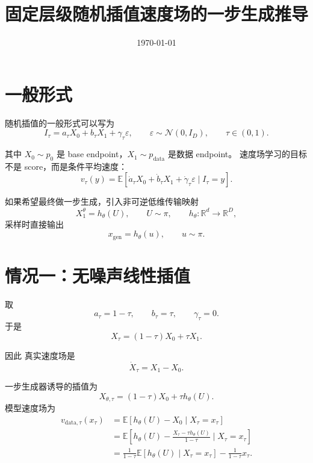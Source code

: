 \documentclass[UTF8,11pt]{ctexart}
\title{固定层级随机插值速度场的一步生成推导}
\author{}
\date{\today}
\newcommand{\E}{\mathbb{E}}
\newcommand{\R}{\mathbb{R}}
\newcommand{\calN}{\mathcal{N}}
\begin{document}
\maketitle

\section{一般形式}

随机插值的一般形式可以写为
\begin{equation}
I_\tau
=
a_\tau X_0
+
b_\tau X_1
+
\gamma_\tau \varepsilon,
\qquad
\varepsilon \sim \calN(0,I_D),
\qquad
\tau\in(0,1).
\end{equation}

其中 \(X_0\sim p_0\) 是 base endpoint，\(X_1\sim p_{\mathrm{data}}\) 是数据 endpoint。
速度场学习的目标不是 score，而是条件平均速度：
\begin{equation}
v_\tau(y)
=
\E
\left[
\dot a_\tau X_0
+
\dot b_\tau X_1
+
\dot \gamma_\tau \varepsilon
\mid
I_\tau=y
\right].
\end{equation}

如果希望最终做一步生成，引入非可逆低维传输映射
\begin{equation}
X_1^\theta=h_\theta(U),
\qquad
U\sim \pi,
\qquad
h_\theta:\R^d\to\R^D,
\end{equation}
采样时直接输出
\begin{equation}
x_{\mathrm{gen}}=h_\theta(u),
\qquad
u\sim\pi.
\end{equation}

\section{情况一：无噪声线性插值}

取
\begin{equation}
a_\tau = 1-\tau,
\qquad
b_\tau = \tau,
\qquad
\gamma_\tau = 0.
\end{equation}
于是
\begin{equation}
X_\tau
=
(1-\tau)X_0+\tau X_1.
\end{equation}

因此 真实速度场是
\begin{equation}
\dot X_\tau
=
X_1-X_0.
\end{equation}


一步生成器诱导的插值为
\begin{equation}
X_{\theta,\tau}
=
(1-\tau)X_0+\tau h_\theta(U).
\end{equation}
模型速度场为
\begin{equation}
   \begin{aligned}
    v_{\mathrm{data},\tau}(x_\tau)&=\E\left[h_\theta(U)-X_0\mid X_\tau=x_\tau\right]\\
    &=\E\left[h_\theta(U)-\frac{X_\tau-\tau h_\theta(U)}{1-\tau}\mid X_\tau=x_\tau\right]\\
    &=\frac{1}{1-\tau}\E\left[h_\theta(U)\mid X_\tau=x_\tau\right]-\frac{1}{1-\tau}x_\tau.
   \end{aligned}
\end{equation}
\end{document}
